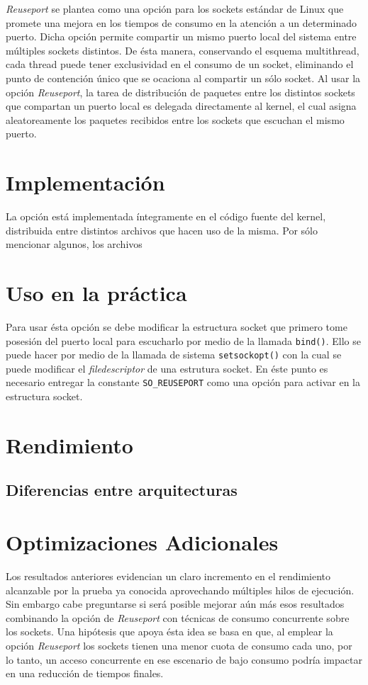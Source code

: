 \emph{Reuseport} se plantea como una opción para los sockets estándar de Linux que promete una mejora en los tiempos de consumo en la atención a un determinado puerto. Dicha opción permite compartir un mismo puerto local del sistema entre múltiples sockets distintos. De ésta manera, conservando el esquema multithread, cada thread puede tener exclusividad en el consumo de un socket, eliminando el punto de contención único que se ocaciona al compartir un sólo socket. Al usar la opción \emph{Reuseport}, la tarea de distribución de paquetes entre los distintos sockets que compartan un puerto local es delegada directamente al kernel, el cual asigna aleatoreamente los paquetes recibidos entre los sockets que escuchan el mismo puerto.

\section{Implementación}
La opción está implementada íntegramente en el código fuente del kernel, distribuida entre distintos archivos que hacen uso de la misma. Por sólo mencionar algunos, los archivos 


\section{Uso en la práctica}
Para usar ésta opción se debe modificar la estructura socket que primero tome posesión del puerto local para escucharlo por medio de la llamada \verb=bind()=. Ello se puede hacer por medio de la llamada de sistema \verb=setsockopt()= con la cual se puede modificar el \emph{filedescriptor} de una estrutura socket. En éste punto es necesario entregar la constante \verb=SO_REUSEPORT= como una opción para activar en la estructura socket.

\section{Rendimiento}

\subsection{Diferencias entre arquitecturas}


\section{Optimizaciones Adicionales}
Los resultados anteriores evidencian un claro incremento en el rendimiento alcanzable por la prueba ya conocida aprovechando múltiples hilos de ejecución. Sin embargo cabe preguntarse si será posible mejorar aún más esos resultados combinando la opción de \emph{Reuseport} con técnicas de consumo concurrente sobre los sockets. Una hipótesis que apoya ésta idea se basa en que, al emplear la opción \emph{Reuseport} los sockets tienen una menor cuota de consumo cada uno, por lo tanto, un acceso concurrente en ese escenario de bajo consumo podría impactar en una reducción de tiempos finales.

